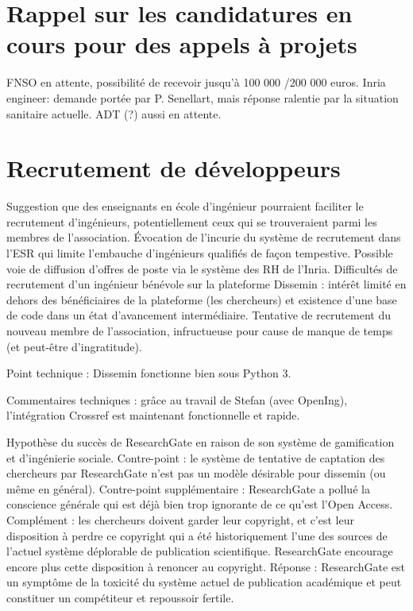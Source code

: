 \documentclass[a4paper]{article}
\begin{document}
\section{Rappel sur les candidatures en cours pour des appels à projets}
FNSO en attente, possibilité de recevoir jusqu'à 100 000  /200 000 euros. 
Inria engineer: demande portée par P. Senellart, mais réponse ralentie par la situation sanitaire actuelle.
ADT (?) aussi en attente. 

\section{Recrutement de développeurs}
Suggestion que des enseignants en école d'ingénieur pourraient faciliter le recrutement d'ingénieurs, potentiellement ceux qui se trouveraient parmi les membres de l'association. 
Évocation de l'incurie du système de recrutement dans l'ESR qui limite l'embauche d'ingénieurs qualifiés de façon tempestive. 
Possible voie de diffusion d'offres de poste via le système des RH de l'Inria.
Difficultés de recrutement d'un ingénieur bénévole sur la plateforme Dissemin : intérêt limité en dehors des bénéficiaires de la plateforme (les chercheurs) et existence d'une base de code dans un état d'avancement intermédiaire.
Tentative de recrutement du nouveau membre de l'association, infructueuse pour cause de manque de temps (et peut-être d'ingratitude).  

Point technique : Dissemin fonctionne bien sous Python 3. 

Commentaires techniques : grâce au travail de Stefan (avec OpenIng), l'intégration Crossref est maintenant fonctionnelle et rapide. 

Hypothèse du succès de ResearchGate en raison de son système de gamification et d'ingénierie sociale. 
Contre-point : le système de tentative de captation des chercheurs par ResearchGate n'est pas un modèle désirable pour dissemin (ou même en général). 
Contre-point supplémentaire : ResearchGate a pollué la conscience générale qui est déjà bien trop ignorante de ce qu'est l'Open Access. 
Complément : les chercheurs doivent garder leur copyright, et c'est leur disposition à perdre ce copyright qui a été historiquement l'une des sources de l'actuel système déplorable de publication scientifique. ResearchGate encourage encore plus cette disposition à renoncer au copyright.
Réponse : ResearchGate est un symptôme de la toxicité du système actuel de publication académique et peut constituer un compétiteur et repoussoir fertile. 
\end{document}
